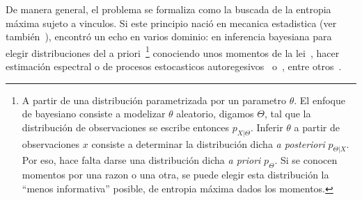 De  manera general,  el problema  se formaliza  como la  buscada de  la entropia
m\'axima sujeto  a vinculos. Si  este principio naci\'o en  mecanica estadistica
(ver  tambi\'en~\cite{Jay57,  Jay57:2, Jay65}),  encontr\'o  un  echo en  varios
dominio:   en   inferencia   bayesiana   para  elegir   distribuciones   del   a
priori~\footnote{A partir  de una distribuci\'on parametrizada  por un parametro
  $\theta$.  El  enfoque de bayesiano  consiste a modelizar  $\theta$ aleatorio,
  digamos  $\Theta$,  tal que  la  distribuci\'on  de  observaciones se  escribe
  entonces  $p_{X|\Theta}$.   Inferir $\theta$  a  partir  de observaciones  $x$
  consiste   a   determinar  la   distribuci\'on   dicha   {\it  a   posteriori}
  $p_{\Theta|X}$.  Por  eso, hace  falta darse una  distribuci\'on dicha  {\it a
    priori} $p_\Theta$.   Si se conocen  momentos por una  razon o una  otra, se
  puede  elegir esta  distribuci\'on la  ``menos informativa''  posible,  \ie de
  entropia  m\'axima dados  los momentos.\label{foot:SZ:Prior}}  conociendo unos
momentos de la lei~\cite{Rob07, Jay68, Jay82}, hacer estimaci\'on espectral o de
procesos      estocasticos     autoregesivos~\cite{Bur67,      Bur75,     Jay82}
o~\cite[cap.~12]{CovTho06}, entre otros~\cite[\& ref.]{KapKes92}.

